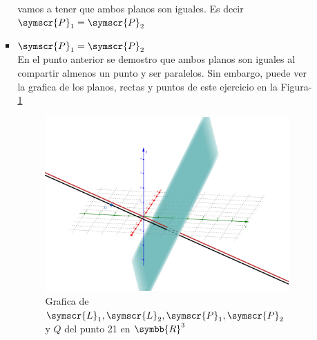 \documentclass{article}
\def\fancyL{\symscr{L}}
\def\fancyP{\symscr{P}}
\def\realR{\symbb{R}}
\begin{document}
\begin{enumerate}
\begin{itemize}
\begin{itemize}
                    vamos a tener que ambos planos son iguales. Es decir \(\fancyP_1 = \fancyP_2\)
                \item \(\fancyP_1 = \fancyP_2\) \\
                    En el punto anterior se demostro que ambos planos son iguales al compartir almenos un punto y ser paralelos. Sin embargo, puede ver la grafica de los planos, rectas y puntos de este ejercicio en 
                    la Figura-\ref{pt-twentyone-graph}           
                    \begin{figure}
                        \centering
                        \includegraphics[width=15cm]{src/21_graph.png}
                        \caption{Grafica de \(\fancyL_1, \fancyL_2, \fancyP_1, \fancyP_2\) y \(Q\) del punto 21 en \(\realR^3\)}%
                        \label{pt-twentyone-graph}
                    \end{figure}
            \end{itemize}
    \end{itemize}
\end{enumerate}
\end{document}
